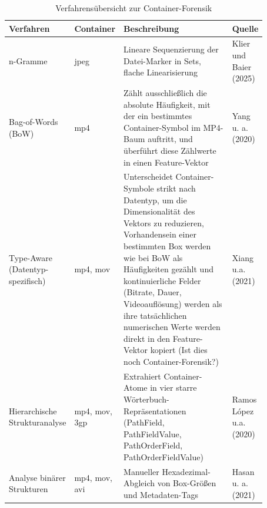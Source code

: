 \begin{table}[H]
    \centering
\caption{Verfahrensübersicht zur Container-Forensik}
\label{tab:containerforensik}
    \begin{tabular}{>{\raggedright\arraybackslash}p{0.17\linewidth}>{\raggedright\arraybackslash}p{0.1\linewidth}>{\raggedright\arraybackslash}p{0.5\linewidth}>{\raggedright\arraybackslash}p{0.1\linewidth}}\toprule
         \textbf{Verfahren}&  \textbf{Container}&  \textbf{Beschreibung}& \textbf{Quelle}\\\midrule
         n-Gramme&  jpeg&  Lineare Sequenzierung der Datei-Marker in Sets, flache Linearisierung& Klier und Baier (2025) \cite{klier_media_2025}\\\hline
 Bag-of-Words (BoW)& mp4& Zählt ausschließlich die absolute Häufigkeit, mit der ein bestimmtes Container-Symbol im MP4-Baum auftritt, und überführt diese Zählwerte in einen Feature-Vektor&Yang u. a. (2020)\\\hline
 Type-Aware (Datentyp-spezifisch)& mp4, mov& Unterscheidet Container-Symbole strikt nach Datentyp, um die Dimensionalität des Vektors zu reduzieren,  Vorhandensein einer bestimmten Box werden wie bei BoW als Häufigkeiten gezählt und kontinuierliche Felder (Bitrate, Dauer, Videoauflösung) werden als ihre tatsächlichen numerischen Werte werden direkt in den Feature-Vektor kopiert (Ist dies noch Container-Forensik?)&Xiang u.a. (2021)\\\hline
 Hierarchische Strukturanalyse& mp4, mov, 3gp& Extrahiert Container-Atome in vier starre Wörterbuch-Repräsentationen (PathField, PathFieldValue, PathOrderField, PathOrderFieldValue)&Ramos López u.a. (2020)\\ \hline
 Analyse binärer Strukturen& mp4, mov, avi& Manueller Hexadezimal-Abgleich von Box-Größen und Metadaten-Tags&Hasan u. a. (2021)\\ \bottomrule
    \end{tabular}
\end{table}